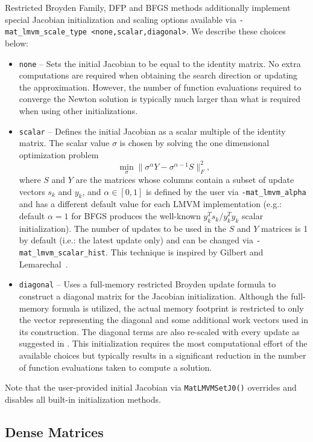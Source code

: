 Restricted Broyden Family, DFP and BFGS methods additionally implement special Jacobian initialization and scaling
options available via \lstinline{-mat_lmvm_scale_type <none,scalar,diagonal>}. We describe these choices below:
\begin{itemize}
  \item \lstinline{none} -- Sets the initial Jacobian to be equal to the identity matrix. No extra computations are
  required when obtaining the search direction or updating the approximation. However, the number of function
  evaluations required to converge the Newton solution is typically much larger than what is required when using
  other initializations.
  \item \lstinline{scalar} -- Defines the initial Jacobian as a scalar multiple of the identity matrix. The scalar
  value $\sigma$ is chosen by solving the one dimensional optimization problem
  \[
  \min_\sigma \|\sigma^\alpha Y - \sigma^{\alpha - 1} S\|_F^2,
  \]
  where $S$ and $Y$ are the matrices whose columns contain a subset of update vectors $s_k$ and $y_k$, and
  $\alpha \in [0, 1]$ is defined by the user via \lstinline{-mat_lmvm_alpha} and has a different default value for
  each LMVM implementation (e.g.: default $\alpha = 1$ for BFGS produces the well-known $y_k^T s_k / y_k^T y_k$
  scalar initialization). The number of updates to be used in the $S$ and $Y$ matrices is 1 by default
  (i.e.: the latest update only) and can be changed via \lstinline{-mat_lmvm_scalar_hist}. This technique is inspired
  by Gilbert and Lemarechal~\cite{gilbert-lemarechal}.
  \item \lstinline{diagonal} -- Uses a full-memory restricted Broyden update formula to construct a diagonal
  matrix for the Jacobian initialization. Although the full-memory formula is utilized, the actual memory footprint
  is restricted to only the vector representing the diagonal and some additional work vectors used in its construction.
  The diagonal terms are also re-scaled with every update as suggested in \cite{gilbert-lemarechal}. This
  initialization requires the most computational effort of the available choices but typically results in a significant
  reduction in the number of function evaluations taken to compute a solution.
\end{itemize}
Note that the user-provided initial Jacobian via \lstinline{MatLMVMSetJ0()} overrides and disables all built-in
initialization methods.

\subsection{Dense Matrices}
\label{sec_matdense}


